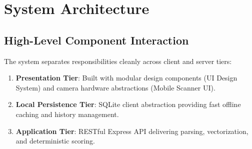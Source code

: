 \section{System Architecture}
\subsection{High-Level Component Interaction}
The system separates responsibilities cleanly across client and server tiers:
\begin{enumerate}
    \item \textbf{Presentation Tier}: Built with modular design components (UI Design System) and camera hardware abstractions (Mobile Scanner UI).
    \item \textbf{Local Persistence Tier}: SQLite client abstraction providing fast offline caching and history management.
    \item \textbf{Application Tier}: RESTful Express API delivering parsing, vectorization, and deterministic scoring.
\end{enumerate}
